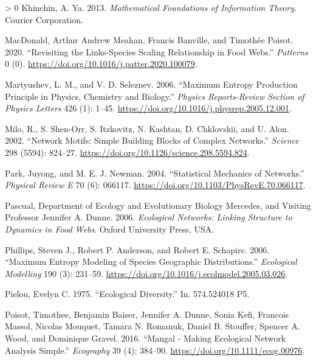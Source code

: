 \documentclass[10pt,oneside]{article}
\newlength{\cslhangindent}
\newenvironment{CSLReferences}[3] %
 {%
  \setlength{\parindent}{0pt}
  \ifodd #1 \everypar{\setlength{\hangindent}{\cslhangindent}}\ignorespaces\fi
  \ifnum #2 > 0
  \setlength{\parskip}{#2\baselineskip}
  \fi
 }%
 {}
\begin{document}
\begin{CSLReferences}{1}{0}
\leavevmode\hypertarget{ref-Khinchin2013MatFou}{}%
Khinchin, A. Ya. 2013. \emph{Mathematical Foundations of Information
Theory}. Courier Corporation.

\leavevmode\hypertarget{ref-MacDonald2020RevLin}{}%
MacDonald, Arthur Andrew Meahan, Francis Banville, and Timothée Poisot.
2020. {``Revisiting the Links-Species Scaling Relationship in Food
Webs.''} \emph{Patterns} 0 (0).
\url{https://doi.org/10.1016/j.patter.2020.100079}.

\leavevmode\hypertarget{ref-Martyushev2006MaxEnt}{}%
Martyushev, L. M., and V. D. Seleznev. 2006. {``Maximum Entropy
Production Principle in Physics, Chemistry and Biology.''} \emph{Physics
Reports-Review Section of Physics Letters} 426 (1): 1--45.
\url{https://doi.org/10.1016/j.physrep.2005.12.001}.

\leavevmode\hypertarget{ref-Milo2002NetMot}{}%
Milo, R., S. Shen-Orr, S. Itzkovitz, N. Kashtan, D. Chklovskii, and U.
Alon. 2002. {``Network Motifs: Simple Building Blocks of Complex
Networks.''} \emph{Science} 298 (5594): 824--27.
\url{https://doi.org/10.1126/science.298.5594.824}.

\leavevmode\hypertarget{ref-Park2004StaMeca}{}%
Park, Juyong, and M. E. J. Newman. 2004. {``Statistical Mechanics of
Networks.''} \emph{Physical Review E} 70 (6): 066117.
\url{https://doi.org/10.1103/PhysRevE.70.066117}.

\leavevmode\hypertarget{ref-Pascual2006EcoNeta}{}%
Pascual, Department of Ecology and Evolutionary Biology Mercedes, and
Visiting Professor Jennifer A. Dunne. 2006. \emph{Ecological Networks:
Linking Structure to Dynamics in Food Webs}. Oxford University Press,
USA.

\leavevmode\hypertarget{ref-Phillips2006MaxEnta}{}%
Phillips, Steven J., Robert P. Anderson, and Robert E. Schapire. 2006.
{``Maximum Entropy Modeling of Species Geographic Distributions.''}
\emph{Ecological Modelling} 190 (3): 231--59.
\url{https://doi.org/10.1016/j.ecolmodel.2005.03.026}.

\leavevmode\hypertarget{ref-Pielou1975EcoDiv}{}%
Pielou, Evelyn C. 1975. {``Ecological Diversity.''} In. 574.524018 P5.

\leavevmode\hypertarget{ref-Poisot2016ManMakb}{}%
Poisot, Timothee, Benjamin Baiser, Jennifer A. Dunne, Sonia Kefi,
Francois Massol, Nicolas Mouquet, Tamara N. Romanuk, Daniel B. Stouffer,
Spencer A. Wood, and Dominique Gravel. 2016. {``Mangal - Making
Ecological Network Analysis Simple.''} \emph{Ecography} 39 (4): 384--90.
\url{https://doi.org/10.1111/ecog.00976}.


\end{CSLReferences}
\end{document}

